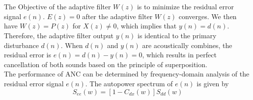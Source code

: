 \\
\\
The Objective of the adaptive filter $W(z)$ is to minimize the residual error signal $e(n)$. $E(z) = 0$ after the adaptive filter $W(z)$ converges. We then have $W(z) = P(z)$ for $X(z) \neq 0$, which implies that $y(n) = d(n)$. Therefore, the adaptive filter output $y(n)$ is identical to the primary disturbance $d(n)$. When $d(n)$ and $y(n)$ are acoustically combines, the residual error is $e(n) = d(n) - y(n) = 0$, which results in perfect cancellation of both sounds based on the principle of superposition.\\
The performance of ANC can be determined by frequency-domain analysis of the residual error signal $e(n)$. The autopower spectrum of $e(n)$ is given by $$S_{ee}(w) = [1-C_{dx}(w)]S_{dd}(w)$$ \cite{Kuo1999}

